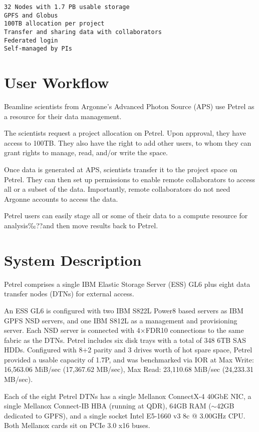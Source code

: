 \documentclass[sigconf]{acmart}
\begin{document}
\begin{verbatim}
32 Nodes with 1.7 PB usable storage
GPFS and Globus
100TB allocation per project
Transfer and sharing data with collaborators
Federated login
Self-managed by PIs
\end{verbatim}



\section{User Workflow}


Beamline scientists from Argonne's Advanced Photon Source (APS) use Petrel as a resource for their data management.

The scientists request a project allocation on Petrel. Upon approval, they have access to 100TB. They also have the right to add other users, to whom they can grant rights to manage, read, and/or write the space.

Once data is generated at APS, scientists transfer it to the project space on Petrel. They can then set up permissions to enable remote collaborators to access all or a subset of the data. Importantly, remote collaborators do not need Argonne accounts to access the data.

Petrel users can easily stage all or some of their data to a compute resource for analysis‰??and then move results back to Petrel.


\section{System Description}

Petrel comprises a single IBM Elastic Storage Server (ESS) GL6 plus eight data transfer nodes (DTNs) for external access.

An ESS GL6 is configured with two IBM S822L Power8 based servers as IBM GPFS NSD servers, and one IBM S812L as a management and provisioning server. 
Each NSD server is connected with 4$\times$FDR10 connections to the same fabric as the DTNs. 
Petrel includes six disk trays with a total of 348 6TB SAS HDDs. 
Configured with 8+2 parity and 3 drives worth of hot spare space, Petrel provided a usable capacity of 1.7P, and was benchmarked via IOR at Max Write: 16,563.06 MiB/sec (17,367.62 MB/sec), Max Read:  23,110.68 MiB/sec (24,233.31 MB/sec).

Each of the eight Petrel DTNs has a single Mellanox ConnectX-4 40GbE NIC, a single Mellanox Connect-IB HBA (running at QDR), 64GB RAM ($\sim$42GB dedicated to GPFS), and a single socket Intel E5-1660 v3 8c @ 3.00GHz CPU. 
Both Mellanox cards sit on PCIe 3.0 x16 buses.
\end{document}
